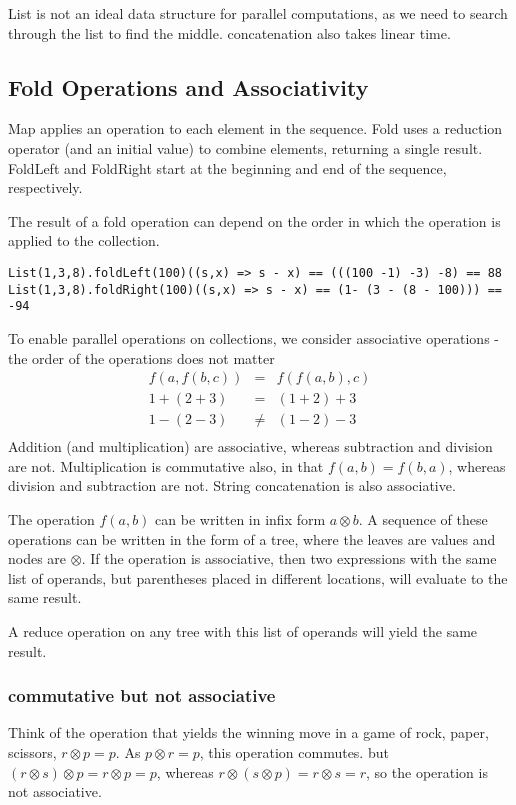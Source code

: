 List is not an ideal data structure for parallel computations, as we need to search through the list to find the middle. concatenation also takes linear time.

\subsection{Fold Operations and Associativity}

Map applies an operation to each element in the sequence. Fold uses a reduction operator (and an initial value) to combine elements, returning a single result. FoldLeft and FoldRight start at the beginning and end of the sequence, respectively. 

The result of a fold operation can depend on the order in which the operation is applied to the collection. 
\begin{lstlisting}
List(1,3,8).foldLeft(100)((s,x) => s - x) == (((100 -1) -3) -8) == 88
List(1,3,8).foldRight(100)((s,x) => s - x) == (1- (3 - (8 - 100))) == -94
\end{lstlisting}

To enable parallel operations on collections, we consider associative operations - the order of the operations does not matter
\begin{eqnarray*}
f(a,f(b,c)) & = & f(f(a,b),c) \\
1 + (2 + 3) & = & (1 + 2) + 3 \\
1 - (2 -3) & \neq & (1 -2) -3 \\
\end{eqnarray*}
Addition (and multiplication) are associative, whereas subtraction and division are not. Multiplication is commutative also, in that $ f(a,b) = f(b,a)$, whereas division and subtraction are not. String concatenation is also associative.

The operation $f(a,b)$ can be written in infix form $ a \otimes b$. A sequence of these operations can be written in the form of a tree, where the leaves are values and nodes are $\otimes$. If the operation is associative, then two expressions with the same list of operands, but parentheses placed in different locations, will evaluate to the same result. 

A reduce operation on any tree with this list of operands will yield the same result.

\subsubsection{commutative but not associative} Think of the operation that yields the winning move in a game of rock, paper, scissors, $r \otimes p = p$. As $p \otimes r = p$, this operation commutes. but $ (r \otimes s) \otimes p = r \otimes p = p$, whereas $r \otimes (s \otimes p) = r \otimes s = r$, so the operation is not associative.

